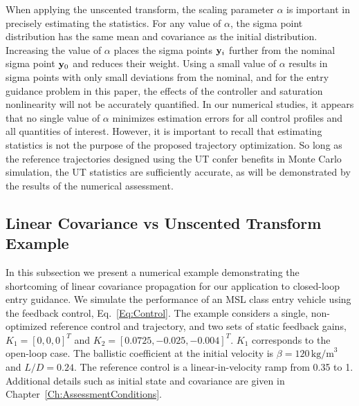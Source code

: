 When applying the unscented transform, the scaling parameter $\alpha$ is important in precisely estimating the statistics. For any value of $\alpha$, the sigma point distribution has the same mean and covariance as the initial distribution. Increasing the value of $\alpha$ places the sigma points $\mathbf{y}_i$ further from the nominal sigma point $\mathbf{y}_0$ and reduces their weight. Using a small value of $\alpha$ results in sigma points with only small deviations from the nominal, and for the entry guidance problem in this paper, the effects of the controller and saturation nonlinearity will not be accurately quantified. In our numerical studies, it appears that no single value of $\alpha$ minimizes estimation errors for all control profiles and all quantities of interest. However, it is important to recall that estimating statistics is not the purpose of the proposed trajectory optimization. So long as the reference trajectories designed using the UT confer benefits in Monte Carlo simulation, the UT statistics are sufficiently accurate, as will be demonstrated by the results of the numerical assessment. 

\subsection{Linear Covariance vs Unscented Transform Example}\label{Subsec:UQExample}
In this subsection we present a numerical example demonstrating the shortcoming of linear covariance propagation for our application to closed-loop entry guidance.
We simulate the performance of an MSL class entry vehicle using the feedback control, Eq.~\eqref{Eq:Control}. The example considers a single, non-optimized reference control and trajectory, and two sets of static feedback gains, $K_1=[0,0,0]^T$ and $K_2=[0.0725, -0.025, -0.004]^T$. $K_1$ corresponds to the open-loop case. The ballistic coefficient at the initial velocity is $\beta=120\,\mathrm{kg/m}^3$ and $L/D = 0.24$. The reference control is a linear-in-velocity ramp from 0.35 to 1. Additional details such as initial state and covariance are given in Chapter~\ref{Ch:AssessmentConditions}.

